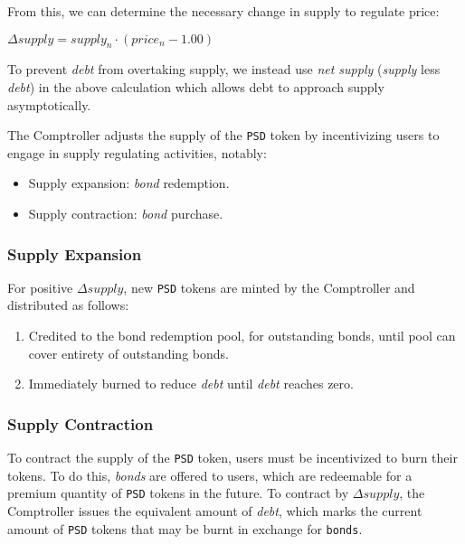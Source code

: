 \documentclass[a4paper, 12pt]{article}
\begin{document}
	From this, we can determine the necessary change in supply to regulate price:
	
	\begin{center}

		$\Delta supply = supply_n \cdot (price_n - 1.00)$

	\end{center}

	To prevent \textit{debt} from overtaking supply, we instead use \textit{net supply} (\textit{supply} less \textit{debt}) in the above calculation which allows debt to approach supply asymptotically. 			\newline

 	The Comptroller adjusts the supply of the \texttt{PSD} token by incentivizing users to engage in supply regulating activities, notably:
	
	\begin{itemize}
	
		\item{Supply expansion: \textit{bond} redemption.}
		\item{Supply contraction: \textit{bond} purchase.}
	
	\end{itemize}

	\subsubsection{Supply Expansion}
	For positive $\Delta supply$, new \texttt{PSD} tokens are minted by the Comptroller and distributed as follows:
	
	\begin{enumerate}

		\item{Credited to the bond redemption pool, for outstanding bonds, until pool can cover entirety of outstanding bonds.}
		\item{Immediately burned to reduce \textit{debt} until \textit{debt} reaches zero.}

	\end{enumerate}

	\subsubsection{Supply Contraction}
	To contract the supply of the \texttt{PSD} token, users must be incentivized to burn their tokens. To do this, \textit{bonds} are offered to users, which are redeemable for a premium quantity of 				\texttt{PSD} tokens in the future.
	To contract by $\Delta supply$, the Comptroller issues the equivalent amount of \textit{debt}, which marks the current amount of \texttt{PSD} tokens that may be burnt in exchange for 					\texttt{bonds}.
\end{document}
